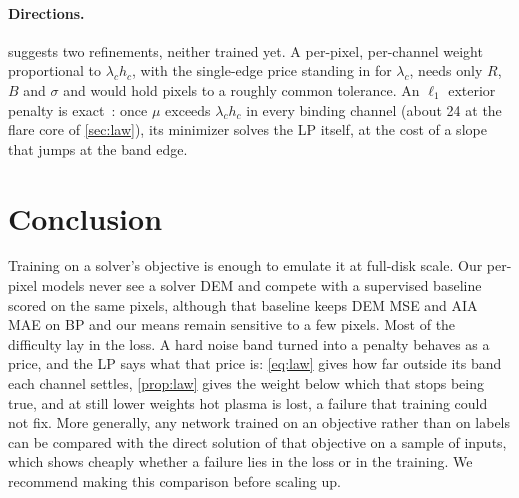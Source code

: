 \paragraph{Directions.}
 suggests two refinements, neither trained yet. A per-pixel, per-channel weight proportional to $\lambda_c h_c$, with the single-edge price standing in for $\lambda_c$, needs only $R$, $B$ and $\sigma$ and would hold pixels to a roughly common tolerance. An $\ell_1$ exterior penalty is exact~\cite{han1979exact}: once $\mu$ exceeds $\lambda_c h_c$ in every binding channel (about 24 at the flare core of \cref{sec:law}), its minimizer solves the LP itself, at the cost of a slope that jumps at the band edge.

\section{Conclusion}
\label{sec:conclusion}

Training on a solver's objective is enough to emulate it at full-disk scale. Our per-pixel models never see a solver DEM and compete with a supervised baseline scored on the same pixels, although that baseline keeps DEM MSE and AIA MAE on BP and our means remain sensitive to a few pixels. Most of the difficulty lay in the loss. A hard noise band turned into a penalty behaves as a price, and the LP says what that price is: \cref{eq:law} gives how far outside its band each channel settles, \cref{prop:law} gives the weight below which that stops being true, and at still lower weights hot plasma is lost, a failure that training could not fix. More generally, any network trained on an objective rather than on labels can be compared with the direct solution of that objective on a sample of inputs, which shows cheaply whether a failure lies in the loss or in the training. We recommend making this comparison before scaling up.
